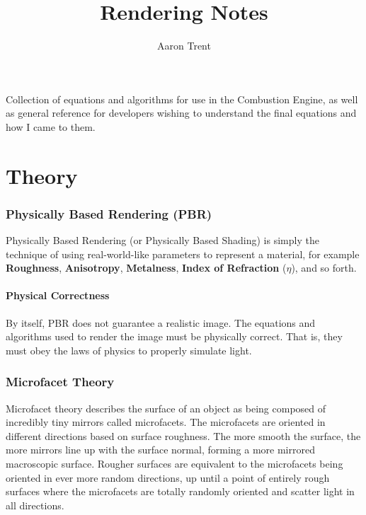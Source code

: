 \documentclass[12pt,letterpaper]{article}
\author{Aaron Trent}
\title{Rendering Notes}
\begin{document}
\maketitle

\begin{center}
Collection of equations and algorithms for use in the Combustion Engine, 
as well as general reference for developers wishing to understand the final equations and how I came to them.
\end{center}

{\footnotesize \tableofcontents}

\setlength{\parindent}{4em}
\setlength{\parskip}{0.8em}

\newpage

\part{Theory}

\section{Physically Based Rendering (PBR)}

Physically Based Rendering (or Physically Based Shading) is simply the technique of using real-world-like parameters to represent
a material, for example \textbf{Roughness}, \textbf{Anisotropy}, \textbf{Metalness}, \textbf{Index of Refraction} ($\eta$), and so forth.

\subsection{Physical Correctness}

By itself, PBR does not guarantee a realistic image. The equations and algorithms used to render the image must be physically correct.
That is, they must obey the laws of physics to properly simulate light.

\section{Microfacet Theory}

Microfacet theory describes the surface of an object as being composed of incredibly tiny mirrors called microfacets. 
The microfacets are oriented in different directions based on surface roughness. The more smooth the surface, the more mirrors line up with the surface normal,
forming a more mirrored macroscopic surface. Rougher surfaces are equivalent to the microfacets being oriented in ever more random directions,
up until a point of entirely rough surfaces where the microfacets are totally randomly oriented and 
scatter light in all directions.
\end{document}
